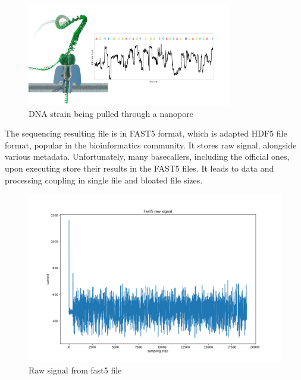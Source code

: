 \documentclass[times, utf8, diplomski, english]{fer}
\begin{document}
\begin{figure}[!ht]
    \begin{center}
        \includegraphics[width=0.8\textwidth]{nanopore}
        
        \caption[DNA strain being pulled through a nanopore]{DNA strain being pulled through a nanopore \protect\footnotemark}
        \label{fg:nanopore}
    \end{center}
\end{figure}

The sequencing resulting file is in FAST5 format, which is adapted HDF5 file format, popular in the bioinformatics community. It stores raw signal, alongside various metadata. Unfortunately, many basecallers, including the official ones, upon executing store their results in the FAST5 files. It leads to data and processing coupling in single file and bloated file sizes. 

\begin{figure}
    \begin{center}
        \includegraphics[width=\textwidth]{fast5_sample}
        \caption{Raw signal from fast5 file}
        \label{fg:fast5}
    \end{center}
\end{figure}
  
\end{document}
